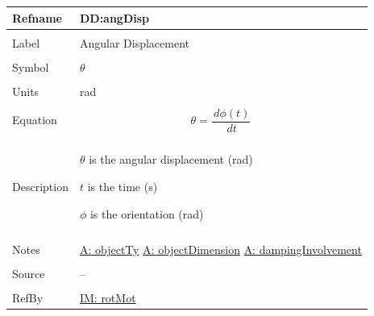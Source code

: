 \documentclass[12pt]{article}
\begin{document}
\noindent \begin{minipage}{\textwidth}
\begin{tabular}{>{\raggedright}p{}>{\raggedright\arraybackslash}p{}}
\toprule \textbf{Refname} & \textbf{DD:angDisp}
\label{DD:angDisp}
\\ \midrule \\
Label & Angular Displacement
\\ \midrule \\
Symbol & $θ$
\\ \midrule \\
Units & rad
\\ \midrule \\
Equation & \begin{displaymath}
           θ=\frac{\,dϕ\left(t\right)}{\,dt}
           \end{displaymath}
\\ \midrule \\
Description & \begin{symbDescription}
              \item{$θ$ is the angular displacement (rad)}
              \item{$t$ is the time (s)}
              \item{$ϕ$ is the orientation (rad)}
              \end{symbDescription}
\\ \midrule \\
Notes & \hyperref[assumpOT]{A: objectTy}
        \hyperref[assumpOD]{A: objectDimension}
        \hyperref[assumpDI]{A: dampingInvolvement}
\\ \midrule \\
Source & --
\\ \midrule \\
RefBy & \hyperref[IM:rotMot]{IM: rotMot}
\\ \bottomrule
\end{tabular}
\end{minipage}
\par~
\end{document}
